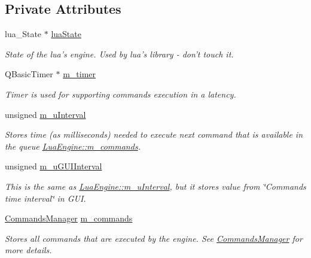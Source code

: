 \subsection*{Private Attributes}
\begin{DoxyCompactItemize}
\item 
lua\-\_\-\-State $\ast$ \hyperlink{class_lua_engine_af9593e71b3d33a62cbf9e3080771bff9}{lua\-State}
\begin{DoxyCompactList}\small\item\em State of the lua's engine. Used by lua's library -\/ don't touch it. \end{DoxyCompactList}\item 
Q\-Basic\-Timer $\ast$ \hyperlink{class_lua_engine_a367284a1461c5a2d2804c3f9b4d94f14}{m\-\_\-timer}
\begin{DoxyCompactList}\small\item\em Timer is used for supporting commands execution in a latency. \end{DoxyCompactList}\item 
unsigned \hyperlink{class_lua_engine_af25b4a96c17c157ae110afa1dd0866ec}{m\-\_\-u\-Interval}
\begin{DoxyCompactList}\small\item\em Stores time (as milliseconds) needed to execute next command that is available in the queue \hyperlink{class_lua_engine_a86a3f32127e36e1ccce6c5a42a298ad5}{Lua\-Engine\-::m\-\_\-commands}. \end{DoxyCompactList}\item 
unsigned \hyperlink{class_lua_engine_ac7d00771a353cc9afa586a6ec10f5d90}{m\-\_\-u\-G\-U\-I\-Interval}
\begin{DoxyCompactList}\small\item\em This is the same as \hyperlink{class_lua_engine_af25b4a96c17c157ae110afa1dd0866ec}{Lua\-Engine\-::m\-\_\-u\-Interval}, but it stores value from \char`\"{}\-Commands time interval\char`\"{} in G\-U\-I. \end{DoxyCompactList}\item 
\hyperlink{class_commands_manager}{Commands\-Manager} \hyperlink{class_lua_engine_a86a3f32127e36e1ccce6c5a42a298ad5}{m\-\_\-commands}
\begin{DoxyCompactList}\small\item\em Stores all commands that are executed by the engine. See \hyperlink{class_commands_manager}{Commands\-Manager} for more details. \end{DoxyCompactList}\item 

\end{DoxyCompactItemize}
